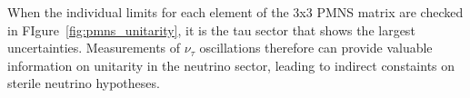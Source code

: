 When the individual limits for each element of the 3x3 PMNS matrix are checked in FIgure~\ref{fig:pmns_unitarity}, it is the tau sector that shows the largest uncertainties.
Measurements of $\nu_\tau$ oscillations therefore can provide valuable information on unitarity in the neutrino sector, leading to indirect constaints on sterile neutrino hypotheses.

